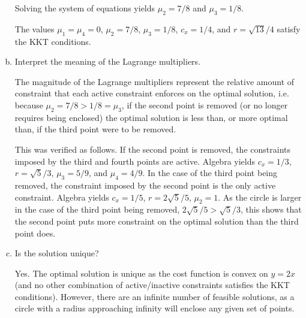 \documentclass{article}
\begin{document}
\begin{enumerate}[a)]
Solving the system of equations yields $\mu_2 = 7/8$ and $\mu_3 = 1/8$.

The values $\mu_1 = \mu_4 = 0$, $\mu_2 = 7/8$, $\mu_3 = 1/8$, $c_x = 1/4$, and $r = \sqrt{13}/4$ satisfy the KKT conditions.



\item Interpret the meaning of the Lagrange multipliers.

The magnitude of the Lagrange multipliers represent the relative amount of constraint that each active constraint enforces on the optimal solution, i.e. because $\mu_2 = 7/8 > 1/8 = \mu_3$, if the second point is removed (or no longer requires being enclosed) the optimal solution is less than, or more optimal than, if the third point were to be removed.

This was verified as follows.
If the second point is removed, the constraints imposed by the third and fourth points are active.
Algebra yields $c_x = 1/3$, $r = \sqrt{5}/3$, $\mu_3 = 5/9$, and $\mu_4 = 4/9$.
In the case of the third point being removed, the constraint imposed by the second point is the only active constraint.
Algebra yields $c_x = 1/5$, $r = 2\sqrt{5}/5$, $\mu_2 = 1$.
As the circle is larger in the case of the third point being removed, $2\sqrt{5}/5 > \sqrt{5}/3$, this shows that the second point puts more constraint on the optimal solution than the third point does.

\item Is the solution unique?

Yes.
The optimal solution is unique as the cost function is convex on $y = 2x$ (and no other combination of active/inactive constraints satisfies the KKT conditions).
However, there are an infinite number of feasible solutions, as a circle with a radius approaching infinity will enclose any given set of points.

\end{enumerate}
\end{document}
